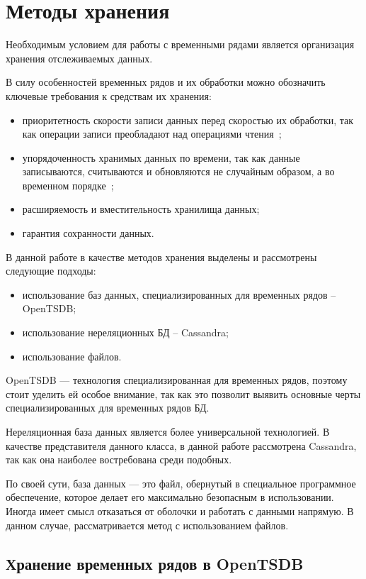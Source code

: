 \chapter{Методы хранения}

Необходимым условием для работы с временными рядами является организация хранения отслеживаемых данных.

В силу особенностей временных рядов и их обработки можно обозначить ключевые требования к средствам их хранения:
\begin{itemize}
    \item приоритетность скорости записи данных перед скоростью их обработки, так как операции записи преобладают над операциями чтения~\cite{poliref1};
    \item упорядоченность хранимых данных по времени, так как данные записываются, считываются и обновляются не случайным образом, а во временном порядке~\cite{poliref1};
    \item расширяемость и вместительность хранилища данных;
    \item гарантия сохранности данных. 
\end{itemize}

В данной работе в качестве методов хранения выделены и рассмотрены следующие подходы:

\begin{itemize}
    \item использование баз данных, специализированных для временных рядов -- OpenTSDB;
    \item использование нереляционных БД -- Cassandra;
    \item использование файлов. 
\end{itemize}

OpenTSDB --- технология специализированная для временных рядов, поэтому стоит уделить ей особое внимание,
так как это позволит выявить основные черты специализированных для временных рядов БД.

Нереляционная база данных является более универсальной технологией.
В качестве представителя данного класса, в данной работе рассмотрена Cassandra, так как она наиболее востребована среди подобных.

По своей сути, база данных --- это файл, обернутый в специальное программное обеспечение,
которое делает его максимально безопасным в использовании.
Иногда имеет смысл отказаться от оболочки и работать с данными напрямую.
В данном случае, рассматривается метод с использованием файлов.

\section{Хранение временных рядов в OpenTSDB}

